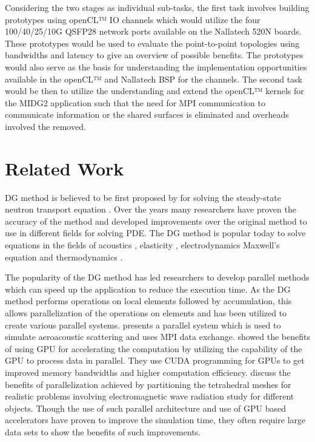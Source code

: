 Considering the two stages as individual sub-tasks, the first task involves building
prototypes using openCL™ IO channels which would utilize the four 100/40/25/10G QSFP28
network ports available on the Nallatech 520N boards. These prototypes would be used
to evaluate the point-to-point topologies using bandwidths and latency to give an
overview of possible benefits. The prototypes would also serve as the basis for
understanding the implementation opportunities available in the openCL™ and
Nallatech BSP for the channels. The second task would be then to utilize the
understanding and extend the openCL™ kernels for the MIDG2 application
such that the need for MPI communication to communicate information or the shared
surfaces is eliminated and overheads involved the removed.


\section{Related Work}

\ac{DG} method is believed to be first proposed by \textcite{reed_triangular_1973} for
solving the steady-state neutron transport equation \cite{hesthaven_nodal_2008}. Over the
years many researchers have proven the accuracy of the method and developed improvements
over the original method to use in different fields for solving \ac{PDE}. The \ac{DG} method
is popular today to solve equations in the fields of acoustics \cite{wilcox_high-order_2010,
atkins_quadrature-free_1998, toulopoulos_high-order_2006}, elasticity \cite{dumbser_arbitrary_2006,
kaser_arbitrary_2006, kaser_arbitrary_2007}, electrodynamics Maxwell’s equation \cite{busch_discontinuous_2011,
cohen_discontinuous_2006, busch_discontinuous_2011, cohen_spatial_2006, cockburn_locally_2004,
konig_discontinuous_2010} and thermodynamics \cite{collis_discontinuous_2002}.

The popularity of the \ac{DG} method has led researchers to develop parallel methods
which can speed up the application to reduce the execution time. As the DG method
performs operations on local elements followed by accumulation, this allows parallelization
of the operations on elements and has been utilized to create various parallel systems.
\textcite{baggag_parallel_1999} presents a parallel system which is used to simulate aeroacoustic
scattering and uses MPI data exchange. \textcite{klockner_nodal_2009} showed the benefits
of using GPU for accelerating the computation by utilizing the capability of the GPU to
process data in parallel. They use CUDA programming for GPUs to get improved memory bandwidths
and higher computation efficiency. \textcite{bernacki_parallel_2006} discuss the benefits
of parallelization achieved by partitioning the tetrahedral meshes for realistic problems
involving electromagnetic wave radiation study for different objects. Though the use of such
parallel architecture and use of GPU based accelerators have proven
to improve the simulation time, they often require large data sets to show the benefits of
such improvements.


